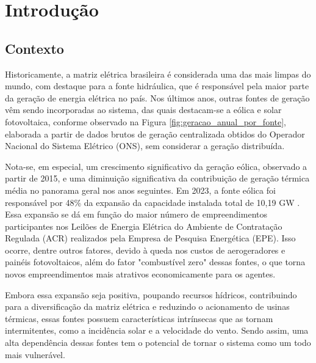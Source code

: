 \chapter{Introdução}
\sloppy																													%

\section{Contexto}
Historicamente, a matriz elétrica brasileira é considerada uma das mais limpas do mundo, com destaque para a fonte
hidráulica, que é responsável pela maior parte da geração de energia elétrica no país. Nos últimos anos, outras fontes
de geração vêm sendo incorporadas ao sistema, das quais destacam-se a eólica e solar fotovoltaica, conforme observado na
Figura \ref{fig:geracao_anual_por_fonte}, elaborada a partir de dados brutos de geração centralizada obtidos do Operador
Nacional do Sistema Elétrico (ONS), sem considerar a geração distribuída.

\begin{figure}[!ht]
	{}
	{}
\end{figure}

Nota-se, em especial, um crescimento significativo da geração eólica, observado a partir de 2015, e uma diminuição 
significativa da contribuição de geração térmica média no panorama geral nos anos seguintes. Em 2023, a fonte eólica 
foi responsável por 48\% da expansão da capacidade instalada total de 10,19 GW \cite{EPE2024}. Essa expansão se dá em 
função do maior número de empreendimentos participantes nos Leilões de Energia Elétrica do Ambiente de Contratação 
Regulada (ACR) realizados pela Empresa de Pesquisa Energética (EPE). Isso ocorre, dentre outros fatores, devido à queda 
nos custos de aerogeradores e painéis fotovoltaicos, além do fator "combustível zero" dessas fontes, o que torna novos 
empreendimentos mais atrativos economicamente para os agentes.

Embora essa expansão seja positiva, poupando recursos hídricos, contribuindo para a diversificação da matriz elétrica e
reduzindo o acionamento de usinas térmicas, essas fontes possuem características intrínsecas que as tornam intermitentes,
como a incidência solar e a velocidade do vento. Sendo assim, uma alta dependência dessas fontes tem o potencial
de tornar o sistema como um todo mais vulnerável.

